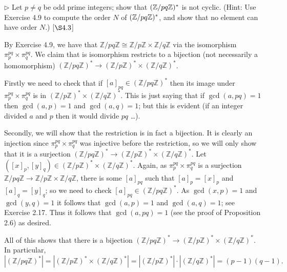 \begin{exercise}
	$\triangleright$ Let $p\neq q$ be odd prime integers; show that $(\mathbb{Z}/pq\mathbb{Z})^{\ast}$ is not cyclic. (Hint: Use Exercise 4.9 to compute the order $N$ of $(\mathbb{Z}/pq\mathbb{Z})^{\ast}$, and show that no element can have order $N$.) [$\S 4.3$]
\end{exercise}
\begin{solution}
	By Exercise 4.9, we have that $\mathbb{Z}/pq\mathbb{Z} \cong \mathbb{Z}/p\mathbb{Z} \times \mathbb{Z}/q\mathbb{Z}$ via the isomorphism $\pi_p^{pq}\times \pi_q^{pq}$. We claim that is isomorphism restricts to a bijection (not necessarily a homomorphism) $(\mathbb{Z}/pq\mathbb{Z})^{\ast} \to (\mathbb{Z}/p\mathbb{Z})^{\ast} \times (\mathbb{Z}/q\mathbb{Z})^{\ast}$. 
	
	Firstly we need to check that if $[a]_{pq}\in(\mathbb{Z}/pq\mathbb{Z})^{\ast}$ then its image under $\pi_p^{pq}\times \pi_q^{pq}$ is in $(\mathbb{Z}/p\mathbb{Z})^{\ast} \times (\mathbb{Z}/q\mathbb{Z})^{\ast}$. This is just saying that if $\gcd (a,pq) = 1$ then $\gcd(a,p) = 1$ and $\gcd(a,q) = 1$; but this is evident (if an integer divided $a$ and $p$ then it would divide $pq$ \ldots). 
	
	Secondly, we will show that the restriction is in fact a bijection. It is clearly an injection since $\pi_p^{pq}\times \pi_q^{pq}$ was injective before the restriction, so we will only show that it is a surjection $(\mathbb{Z}/pq\mathbb{Z})^{\ast} \to (\mathbb{Z}/p\mathbb{Z})^{\ast} \times (\mathbb{Z}/q\mathbb{Z})^{\ast}$. Let $([x]_p,[y]_q) \in (\mathbb{Z}/p\mathbb{Z})^{\ast} \times (\mathbb{Z}/q\mathbb{Z})^{\ast}$. Again, as $\pi_p^{pq}\times \pi_q^{pq}$ is a surjection $\mathbb{Z}/pq\mathbb{Z} \to \mathbb{Z}/p\mathbb{Z} \times \mathbb{Z}/q\mathbb{Z}$, there is some $[a]_{pq}$ such that $[a]_p = [x]_p$ and $[a]_q = [y]_q$; so we need to check $[a]_{pq}\in (\mathbb{Z}/pq\mathbb{Z})^{\ast}$. As $\gcd(x,p) = 1$ and $\gcd(y,q) = 1$ it follows that $\gcd(a,p) = 1$ and $\gcd(a,q) = 1$; see Exercise 2.17. Thus it follows that $\gcd(a,pq) = 1$ (see the proof of Proposition 2.6) as desired. 
	
	All of this shows that there is a bijection $(\mathbb{Z}/pq\mathbb{Z})^{\ast} \to (\mathbb{Z}/p\mathbb{Z})^{\ast} \times (\mathbb{Z}/q\mathbb{Z})^{\ast}$. In particular, 
	\[|(\mathbb{Z}/pq\mathbb{Z})^{\ast}| = |(\mathbb{Z}/p\mathbb{Z})^{\ast} \times (\mathbb{Z}/q\mathbb{Z})^{\ast}| = |(\mathbb{Z}/p\mathbb{Z})^{\ast}|\cdot |(\mathbb{Z}/q\mathbb{Z})^{\ast}| = (p-1)(q-1).\]
	

\end{solution}

